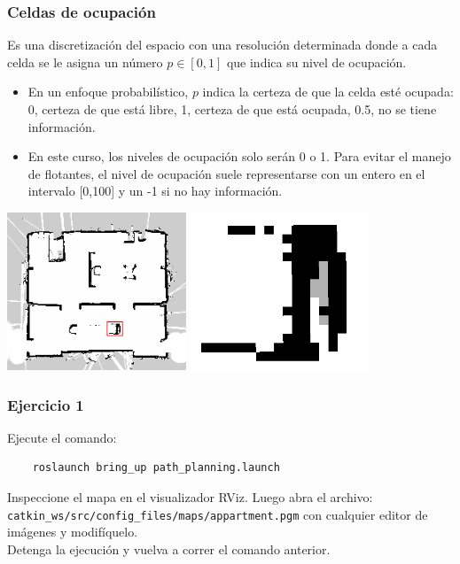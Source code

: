\begin{frame}\frametitle{Celdas de ocupación}
  Es una discretización del espacio con una resolución determinada donde a cada celda se le asigna un número $p\in[0,1]$ que indica su nivel de ocupación.
  \begin{itemize}
  \item En un enfoque probabilístico, $p$ indica la certeza de que la celda esté ocupada: 0, certeza de que está libre, 1, certeza de que está ocupada, 0.5, no se tiene información.
  \item En este curso, los niveles de ocupación solo serán 0 o 1.
 Para evitar el manejo de flotantes, el nivel de ocupación suele representarse con un entero en el intervalo [0,100] y un -1 si no hay información. 
  \end{itemize}
  \includegraphics[width=0.4\textwidth]{Figures/OccupancyGrid.png}
  \includegraphics[width=0.4\textwidth]{Figures/OccupancyGridZoom.png}
\end{frame}

\begin{frame}[containsverbatim]\frametitle{Ejercicio 1}
  Ejecute el comando:
  \begin{lstlisting}
    roslaunch bring_up path_planning.launch
  \end{lstlisting}
  Inspeccione el mapa en el visualizador RViz. Luego abra el archivo:
  \texttt{catkin\_ws/src/config\_files/maps/appartment.pgm}
  con cualquier editor de imágenes y modifíquelo.
  \\Detenga la ejecución y vuelva a correr el comando anterior. 
\end{frame}

